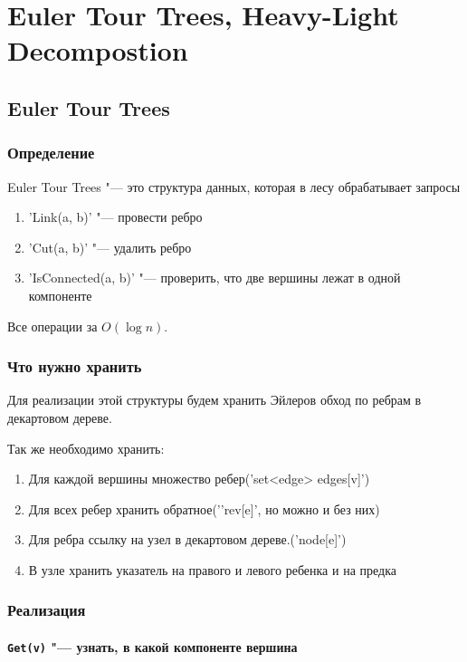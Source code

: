 ﻿\chapter{Euler Tour Trees, Heavy-Light Decompostion}

\section{Euler Tour Trees}
\subsection{Определение}
Euler Tour Trees "--- это структура данных, которая в лесу обрабатывает запросы
\begin{enumerate}
	\item \cpp'Link(a, b)' "--- провести ребро
	\item \cpp'Cut(a, b)' "--- удалить ребро
	\item \cpp'IsConnected(a, b)' "--- проверить, что две вершины лежат в одной компоненте
\end{enumerate}
Все операции за $O(\log n)$.

\subsection{Что нужно хранить}

Для реализации этой структуры будем хранить Эйлеров обход по ребрам в декартовом дереве.


Так же необходимо хранить:
\begin{enumerate}
	\item Для каждой вершины множество ребер(\cpp'set<edge> edges[v]')
	\item Для всех ребер хранить обратное('\cpp'rev[e]', но можно и без них)
	\item Для ребра ссылку на узел в декартовом дереве.(\cpp'node[e]')
	\item В узле хранить указатель на правого и левого ребенка и на предка
\end{enumerate}

\subsection{Реализация}

\subsubsection{\texttt{Get(v)} "--- узнать, в какой компоненте вершина}

